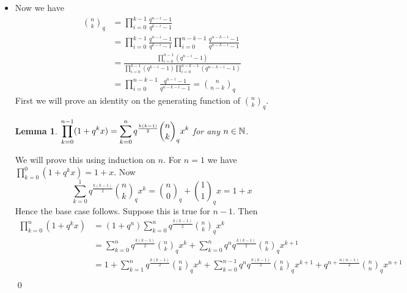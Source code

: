 \documentclass[a4paper, 11pt]{article}
\newtheorem{lemma}{Lemma}
\renewenvironment{proof}{\noindent{\it \textbf{Proof:}}\hspace*{1em}}{\hfill\qed\bigskip\\}
\begin{document}
{\begin{itemize}
\begin{itemize}
\begin{align*}
	                                            & = \frac{q^{n-k}-1+ (q^k-1)q^{n-k}}{q^{k}-1}\prod_{i=0}^{k-2}\frac{q^{n-1-i}-1}{q^{k-1-i}-1}                              \\
	                                            & = \frac{q^n-1}{q^k-1}\prod_{i=0}^{k-2}\frac{q^{n-1-i}-1}{q^{k-1-i}-1}                                                    \\
	                                            & = \frac{q^n-1}{q^k-1}\prod_{i=1}^{k-1}\frac{q^{n-i}-1}{q^{k-i}-1}                                                        \\
	                                            & = \prod_{i=0}^{k-1}\frac{q^{n-i}-1}{q^{k-i}-1}= \binom{n}{k}_q
\end{align*}
\item \parinn 
Now we have \begin{align*}
	\binom{n}{k}_q & =\prod_{i=0}^{k-1}\frac{q^{n-i}-1}{q^{k-i}-1}                                                                           \\
	               & =\prod_{i=0}^{k-1}\frac{q^{n-i}-1}{q^{k-i}-1}\prod_{i=0}^{n-k-1}\frac{q^{n-k-i}-1}{q^{n-k-i}-1}                         \\
	               & =\frac{\prod\limits_{i=0}^{n-1}(q^{n-i}-1)}{\prod\limits_{i=0}^{k-1}(q^{k-i}-1)\prod\limits_{i=0}^{n-k-1}(q^{n-k-i}-1)} \\
	               & =\prod_{i=0}^{n-k-1}\frac{q^{n-i}-1}{q^{n-k-i}-1}=\binom{n}{n-k}_q
\end{align*}
First we will prove an identity on the generating function of $\binom{n}{k}_q$. 
\begin{lemma}\label{qbinomgen}
	$\displaystyle{\prod\limits_{k=0}^{n-1}(1+q^kx)=\sum\limits_{k=0}^{n}q^{\frac{k(k-1)}2}\binom{n}{k}_qx^k}$ for any $n\in \mathbb{N}$.
\end{lemma}
\begin{proof}
	We will prove this using induction on $n$. For $n=1$ we have $\prod\limits_{k=0}^{0}(1+q^kx)=1+x$. Now $$\sum_{k=0}^{1}q^{\frac{k(k-1)}2}\binom{n}{k}_qx^k=\binom{n}{0}_q+\binom{1}{1}_qx=1+x$$Hence the base case follows. Suppose this is true for $n-1$. Then \begin{align*}
		\prod_{k=0}^n (1+q^k x) & = (1+q^n)\sum_{k=0}^n q^{\frac{k(k-1)}2}\binom{n}{k}_qx^k\\
		& = \sum_{k=0}^n q^{\frac{k(k-1)}2}\binom{n}{k}_qx^k + \sum_{k=0}^n q^nq^{\frac{k(k-1)}2}\binom{n}{k}_qx^{k+1}\\
		& = 1+ \sum_{k=1}^n q^{\frac{k(k-1)}2}\binom{n}{k}_qx^k + \sum_{k=0}^{n-1} q^n q^{\frac{k(k-1)}2}\binom{n}{k}_qx^{k+1}+q^{n+\frac{n(n-1)}{2}}\binom{n}{n}_q x^{n+1}\\

\end{align*}
\end{proof}
\end{itemize}
\end{itemize}}
\end{document}
